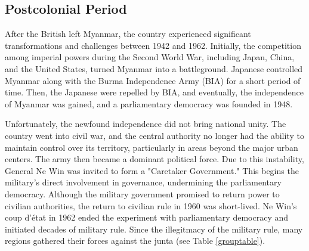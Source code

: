 \documentclass[man,floatsintext]{apa7}
\begin{document}
\subsection{Postcolonial Period}

After the British left Myanmar, the country experienced significant transformations and challenges between 1942 and 1962. Initially, the competition among imperial powers during the Second World War, including Japan, China, and the United States, turned Myanmar into a battleground. Japanese controlled Myanmar along with the Burma Independence Army (BIA) for a short period of time. Then, the Japanese were repelled by BIA, and eventually, the independence of Myanmar was gained, and a parliamentary democracy was founded in 1948. \autocite[225-238]{aung-thwinHistoryMyanmarAncient2012}

Unfortunately, the newfound independence did not bring national unity. The country went into civil war, and the central authority no longer had the ability to maintain control over its territory, particularly in areas beyond the major urban centers. The army then became a dominant political force. Due to this instability, General Ne Win was invited to form a "Caretaker Government." This begins the military's direct involvement in governance, undermining the parliamentary democracy. Although the military government promised to return power to civilian authorities, the return to civilian rule in 1960 was short-lived. Ne Win's coup d'état in 1962 ended the experiment with parliamentary democracy and initiated decades of military rule. \autocite[238-244]{aung-thwinHistoryMyanmarAncient2012} Since the illegitmacy of the military rule, many regions gathered their forces against the junta (see Table \ref{grouptable}).
\end{document}
